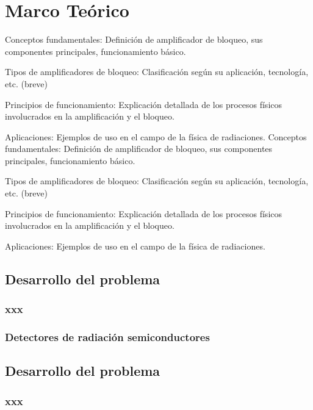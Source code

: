 \chapter*{Marco Teórico} %
Conceptos fundamentales: Definición de amplificador de bloqueo, sus componentes principales, funcionamiento básico.

Tipos de amplificadores de bloqueo: Clasificación según su aplicación, tecnología, etc. (breve)

Principios de funcionamiento: Explicación detallada de los procesos físicos involucrados en la amplificación y el bloqueo. 

Aplicaciones: Ejemplos de uso en el campo de la física de radiaciones.
Conceptos fundamentales: Definición de amplificador de bloqueo, sus componentes principales, funcionamiento básico.

Tipos de amplificadores de bloqueo: Clasificación según su aplicación, tecnología, etc. (breve) 

Principios de funcionamiento: Explicación detallada de los procesos físicos involucrados en la amplificación y el bloqueo. 

Aplicaciones: Ejemplos de uso en el campo de la física de radiaciones.
\section*{Desarrollo del problema}

\subsection*{xxx}

\subsection*{Detectores de radiación semiconductores}
\section*{Desarrollo del problema}

\subsection*{xxx}
\newpage